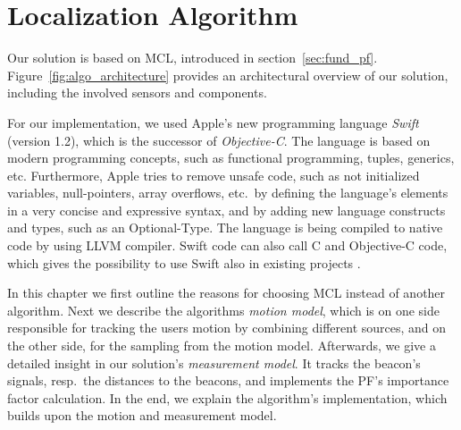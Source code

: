 \chapter{Localization Algorithm} \label{chap:pf}
Our solution is based on \acl{MCL}, introduced in section~\ref{sec:fund_pf}. Figure~\ref{fig:algo_architecture} provides an architectural overview of our solution, including the involved sensors and components.

For our implementation, we used Apple's new programming language \emph{Swift} (version 1.2), which is the successor of \emph{Objective-C}. The language is based on modern programming concepts, such as functional programming, tuples, generics, etc. Furthermore, Apple tries to remove unsafe code, such as not initialized variables, null-pointers, array overflows, etc.\ by defining the language's elements in a very concise and expressive syntax, and by adding new language constructs and types, such as an Optional-Type. The language is being compiled to native code by using LLVM compiler. Swift code can also call C and Objective-C code, which gives the possibility to use Swift also in existing projects \citep{apple:swift}.

In this chapter we first outline the reasons for choosing \acs{MCL} instead of another algorithm. Next we describe the algorithms \emph{motion model}, which is on one side responsible for tracking the users motion by combining different sources, and on the other side, for the sampling from the motion model. Afterwards, we give a detailed insight in our solution's \emph{measurement model}. It tracks the beacon's signals, resp.\ the distances to the beacons, and implements the \acs{PF}'s importance factor calculation. In the end, we explain the algorithm's implementation, which builds upon the motion and measurement model.

%

